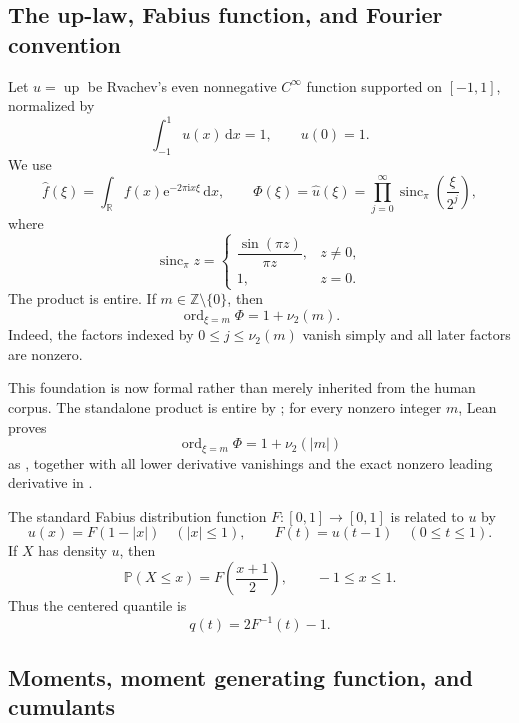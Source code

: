 \documentclass[11pt]{article}
\numberwithin{equation}{section}
\theoremstyle{definition}
\theoremstyle{remark}
\DeclareMathOperator{\ord}{ord}
\newcommand{\R}{\mathbb R}
\newcommand{\Z}{\mathbb Z}
\newcommand{\Up}{\operatorname{up}}
\newcommand{\sincpi}{\operatorname{sinc}_{\pi}}
\newcommand{\dd}{\,\mathrm d}
\newcommand{\e}{\mathrm e}
\newcommand{\iu}{\mathrm i}
\newcommand{\abs}[1]{\left|#1\right|}
\begin{document}
\subsection{The up-law, Fabius function, and Fourier convention}

Let $u=\Up$ be Rvachev's even nonnegative $C^\infty$ function supported on $[-1,1]$, normalized by
\[
 \int_{-1}^{1}u(x)\dd x=1,
 \qquad u(0)=1.
\]
We use
\begin{equation}
 \widehat f(\xi)=\int_{\R}f(x)\e^{-2\pi\iu x\xi}\dd x,
 \qquad
 \Phi(\xi)=\widehat u(\xi)
 =\prod_{j=0}^{\infty}\sincpi\!\left(\frac{\xi}{2^j}\right),
 \label{eq:Phi-product}
\end{equation}
where
\[
 \sincpi z=\begin{cases}\dfrac{\sin(\pi z)}{\pi z},&z\ne0,\\[0.4em]1,&z=0.\end{cases}
\]
The product is entire.  If $m\in\Z\setminus\{0\}$, then
\begin{equation}
 \ord_{\xi=m}\Phi=1+\nu_2(m).
 \label{eq:integer-multiplicity}
\end{equation}
Indeed, the factors indexed by $0\le j\le\nu_2(m)$ vanish simply and all later factors are nonzero.

This foundation is now formal rather than merely inherited from the human
corpus.  The standalone product is entire by
; for every nonzero
integer \(m\), Lean proves
\[
 \operatorname{ord}_{\xi=m}\Phi=1+\nu_2(|m|)
\]
as , together with
all lower derivative vanishings and the exact nonzero leading derivative
in .

The standard Fabius distribution function $F:[0,1]\to[0,1]$ is related to $u$ by
\begin{equation}
 u(x)=F(1-\abs{x})\quad (\abs{x}\le1),
 \qquad
 F(t)=u(t-1)\quad(0\le t\le1).
 \label{eq:F-up-relation}
\end{equation}
If $X$ has density $u$, then
\begin{equation}
 \mathbb P(X\le x)=F\!\left(\frac{x+1}{2}\right),
 \qquad -1\le x\le1.
 \label{eq:centered-CDF}
\end{equation}
Thus the centered quantile is
\begin{equation}
 q(t)=2F^{-1}(t)-1.
 \label{eq:centered-quantile}
\end{equation}

\subsection{Moments, moment generating function, and cumulants}
\end{document}
